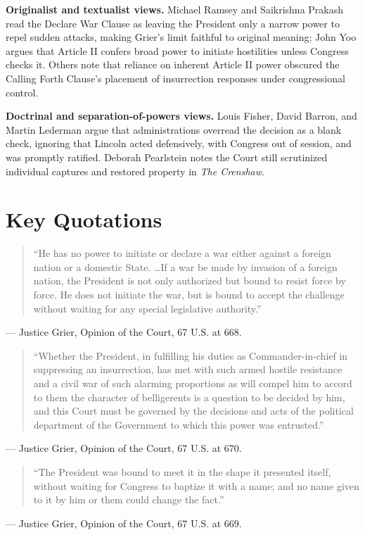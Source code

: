 \documentclass[12pt]{article}
\begin{document}
\textbf{Originalist and textualist views.} Michael Ramsey and Saikrishna Prakash read the Declare War Clause as leaving the President only a narrow power to repel sudden attacks, making Grier's limit faithful to original meaning; John Yoo argues that Article II confers broad power to initiate hostilities unless Congress checks it. Others note that reliance on inherent Article II power obscured the Calling Forth Clause's placement of insurrection responses under congressional control.

\textbf{Doctrinal and separation-of-powers views.} Louis Fisher, David Barron, and Martin Lederman argue that administrations overread the decision as a blank check, ignoring that Lincoln acted defensively, with Congress out of session, and was promptly ratified. Deborah Pearlstein notes the Court still scrutinized individual captures and restored property in \textit{The Crenshaw}.

\section{Key Quotations}

\begin{quote}
``He has no power to initiate or declare a war either against a foreign nation or a domestic State. \ldots If a war be made by invasion of a foreign nation, the President is not only authorized but bound to resist force by force. He does not initiate the war, but is bound to accept the challenge without waiting for any special legislative authority.''
\end{quote}
\noindent --- Justice Grier, Opinion of the Court, 67 U.S. at 668.

\begin{quote}
``Whether the President, in fulfilling his duties as Commander-in-chief in suppressing an insurrection, has met with such armed hostile resistance and a civil war of such alarming proportions as will compel him to accord to them the character of belligerents is a question to be decided by him, and this Court must be governed by the decisions and acts of the political department of the Government to which this power was entrusted.''
\end{quote}
\noindent --- Justice Grier, Opinion of the Court, 67 U.S. at 670.

\begin{quote}
``The President was bound to meet it in the shape it presented itself, without waiting for Congress to baptize it with a name; and no name given to it by him or them could change the fact.''
\end{quote}
\noindent --- Justice Grier, Opinion of the Court, 67 U.S. at 669.
\end{document}
